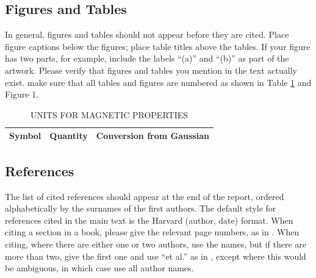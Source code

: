 \documentclass[12pt,a4paper]{article}
\begin{document}





\subsection{Figures and Tables}
In general, figures and tables should not appear before they are cited.  Place figure captions below the figures; place table titles above the tables.  If your figure has two parts, for example, include the labels ``(a)'' and ``(b)'' as part of the artwork.  Please verify that figures and tables you mention in the text actually exist.  make sure that all tables and figures are numbered as shown in Table \ref{units} and Figure 1.

\begin{table}[htb]
\centering
\caption{UNITS FOR MAGNETIC PROPERTIES}
\vspace*{6pt}
\label{units}
\begin{tabular}{ccc}\hline\hline
Symbol & Quantity & Conversion from Gaussian \\ \hline
\end{tabular}
\end{table}


\subsection{References}

The list of cited references should appear at the end of the report, ordered alphabetically by the surnames of the first authors.  The default style for references cited in the main text is the  Harvard (author, date) format.  When citing a section in a book, please give the relevant page numbers, as in \cite[p293]{budgen}.  When citing, where there are either one or two authors, use the names, but if there are more than two, give the first one and use ``et al.'' as in  , except where this would be ambiguous, in which case use all author names.
\end{document}
